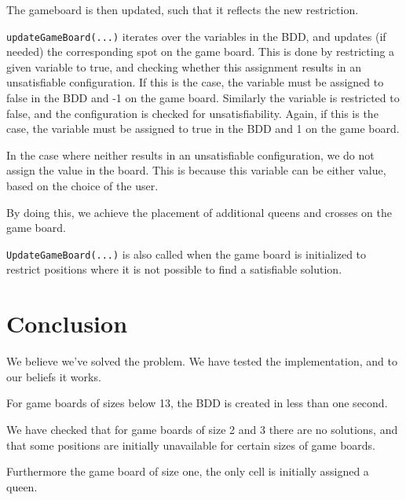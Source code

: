 \newpar The gameboard is then updated, such that it reflects the new restriction.

\newpar\texttt{updateGameBoard(...)} iterates over the variables in the BDD, and updates (if needed) the corresponding spot on the game board. This is done by restricting a given variable to true, and checking whether this assignment results in an unsatisfiable configuration. If this is the case, the variable must be assigned to false in the BDD and -1 on the game board. Similarly the variable is restricted to false, and the configuration is checked for unsatisfiability. Again, if this is the case, the variable must be assigned to true in the BDD and 1 on the game board.

\newpar In the case where neither results in an unsatisfiable configuration, we do not assign the value in the board. This is because this variable can be either value, based on the choice of the user.

\newpar By doing this, we achieve the placement of additional queens and crosses on the game board.

\newpar \texttt{UpdateGameBoard(...)} is also called when the game board is initialized to restrict positions where it is not possible to find a satisfiable solution.

\section{Conclusion}
We believe we've solved the problem. We have tested the implementation, and to our beliefs it works.

For game boards of sizes below 13, the BDD is created in less than one second.

\newpar We have checked that for game boards of size 2 and 3 there are no solutions, and that some positions are initially unavailable for certain sizes of game boards.

\newpar Furthermore the game board of size one, the only cell is initially assigned a queen.